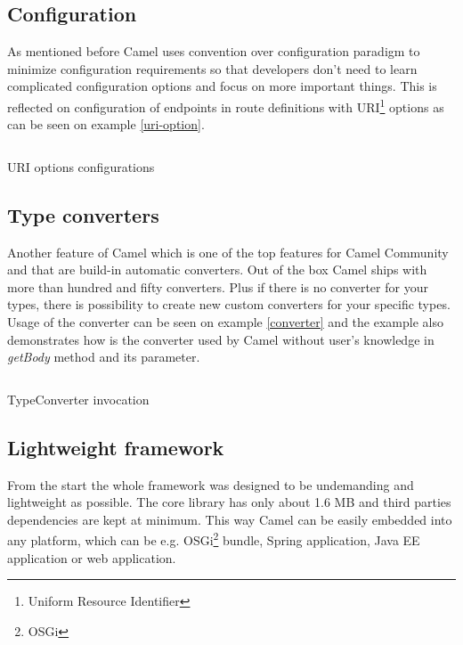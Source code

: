 \documentclass[12pt,final,oneside]{fithesis2}
\begin{document}
\subsection*{Configuration}
As mentioned before Camel uses convention over configuration paradigm to minimize configuration requirements so that developers don't need to learn complicated configuration options and focus on more important things. This is reflected on configuration of endpoints in route definitions with URI\footnote{Uniform Resource Identifier} options as can be seen on example \ref{uri-option}.
\begin{listing}[ht]
	\inputminted[]{java}{sources/uri.java}
	\caption{URI options configurations}
	\label{uri-option}
\end{listing}

\subsection*{Type converters}
Another feature of Camel which is one of the top features for Camel Community and that are build-in automatic converters. Out of the box Camel ships with more than hundred and fifty converters\cite{camel-in-action}. Plus if there is no converter for your types, there is possibility to create new custom converters for your specific types. Usage of the converter can be seen on example \ref{converter} and the example also demonstrates how is the converter used by Camel without user's knowledge in \textit{getBody} method and its parameter.

\begin{listing}[ht, p!]
	\inputminted[]{java}{sources/converter.java}
	\caption{TypeConverter invocation}
	\label{converter}
\end{listing}


\subsection*{Lightweight framework}
From the start the whole framework was designed to be undemanding and lightweight as possible. The core library has only about 1.6 MB and third parties dependencies are kept at minimum. This way Camel can be easily embedded into any platform, which can be e.g. OSGi\footnote{OSGi} bundle, Spring application, Java EE application or web application. 
\end{document}
